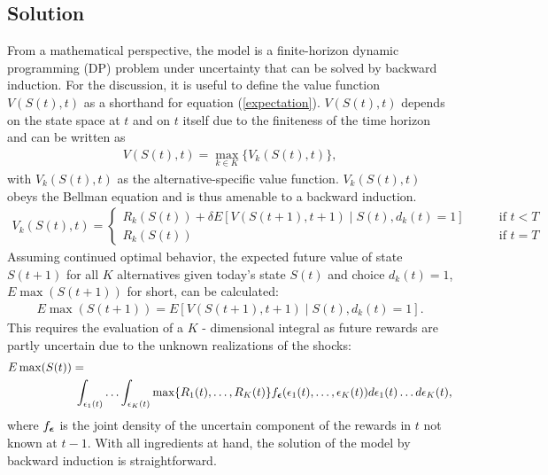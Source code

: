 \subsection{Solution}
From a mathematical perspective, the model is a finite-horizon dynamic programming (DP) problem under uncertainty that can be solved by backward induction. For the discussion, it is useful to define the value function $V(S(t),t)$ as a shorthand for equation (\ref{expectation}). $V(S(t),t)$ depends on the state space at $t$ and on $t$ itself due to the finiteness of the time horizon and can be written as
%
\begin{align*}
V(S(t),t) = \max_{k \in K}\{V_k(S(t),t)\},
\end{align*}
%
with $V_k(S(t),t)$ as the alternative-specific value function. $V_k(S(t),t)$ obeys the Bellman equation \citep{Bellman.1957} and is thus amenable to a backward induction.
%
\begin{align*}
V_k(S(t),t) = \begin{cases} R_k(S(t)) + \delta E\left[V(S(t + 1), t + 1) \mid S(t), d_k(t) = 1\right] &\qquad\mbox{if } t < T \\
R_k(S(t)) &\qquad\mbox{if } t = T
\end{cases}
\end{align*}
%
Assuming continued optimal behavior, the expected future value of state $S(t + 1)$ for all $K$ alternatives given today's state $S(t)$ and choice $d_k(t) = 1$, $E\max(S(t + 1))$ for short, can be calculated:
%
\begin{align*}
E\max(S(t + 1)) = E\left[V(S(t + 1), t + 1) \mid S(t), d_k(t) = 1\right].
\end{align*}
%
This requires the evaluation of a $K$ - dimensional integral as future rewards are partly uncertain due to the unknown realizations of the shocks:
%
\begin{align*}
\nonumber E\max(S(t)) =\hspace{11cm}\\
\int_{\epsilon_1(t)}\hdots\int_{\epsilon_K(t)}\max\{R_1(t), \hdots, R_K(t)\}f_{\bs\epsilon}(\epsilon_1(t),\hdots,\epsilon_K(t))d\epsilon_1(t)\hdots d\epsilon_K(t),
\end{align*}
where $f_{\boldsymbol\epsilon}$ is the joint density of the uncertain component of the rewards in $t$ not known at $t - 1$. With all ingredients at hand, the solution of the model by backward induction is straightforward.
